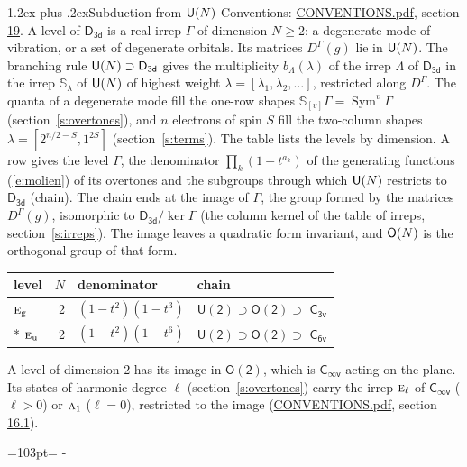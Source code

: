 \documentclass[10pt,a4paper]{article}
\makeatletter
\renewcommand\section{\@startsection{section}{1}{\z@}{-3ex plus -1ex minus -.2ex}%
  {1.2ex plus .2ex}{\normalfont\large\sffamily\bfseries\color{parttitle}}}
\newcommand{\needspace}[1]{\par\penalty-100\begingroup\dimen0=#1\relax\dimen2=\pagegoal
  \advance\dimen2-\pagetotal\ifdim\dimen0>\dimen2\relax\ifdim\dimen2>0pt\vfil\break\fi\fi
  \endgroup}
\numberwithin{equation}{section}
\newcommand{\grp}[1]{\mathsf{#1}}
\newcommand{\irr}[1]{\text{\normalfont\scshape #1}}
\newcommand{\ptag}[1]{\mathrm{#1}}
\newcommand{\repD}[1]{D^{#1}}
\newcommand{\schur}[1]{\mathbb{S}_{#1}}
\newcommand{\shape}[1]{[#1]}
\makeatother
\begin{document}
\section{Subduction from \texorpdfstring{$\grp{U(\mathnormal{N})}$}{U(N)}}\label{s:unitary}
Conventions: \href{../../CONVENTIONS.pdf}{CONVENTIONS.pdf}, section \href{../../CONVENTIONS.pdf\#conv.19}{19}.
\leavevmode\label{n:local.level.dimension}A level of $\grp{D_{3d}}$ is a real irrep $\Gamma$ of dimension $N \ge 2$: a degenerate mode of vibration, or a set of degenerate orbitals. \label{n:group.unitary}Its matrices $\repD{\Gamma}(g)$ lie in $\grp{U(\mathnormal{N})}$. \label{n:irrep.schur}\label{n:shape.partition}\label{n:local.partition}\label{n:function.multiplicity.unitary}The branching rule $\grp{U(\mathnormal{N})} \supset \grp{D_{3d}}$ gives the multiplicity $b_\Lambda(\lambda)$ of the irrep $\Lambda$ of $\grp{D_{3d}}$ in the irrep $\schur{\lambda}$ of $\grp{U(\mathnormal{N})}$ of highest weight $\lambda = \shape{\lambda_1, \lambda_2, \dots}$, restricted along $\repD{\Gamma}$. \label{n:local.partition.power}\label{n:local.electrons}\label{n:local.spin}The quanta of a degenerate mode fill the one-row shapes $\schur{\shape{v}}\Gamma = \operatorname{Sym}^{v}\Gamma$ (section~\ref{s:overtones}), and $n$ electrons of spin $S$ fill the two-column shapes $\lambda = \shape{2^{n/2-S}, 1^{2S}}$ (section~\ref{s:terms}).
The table lists the levels by dimension. \label{n:head.level}\label{n:head.denominator}\label{n:index.overtone.denominator}\label{n:head.chain}A row gives the level $\Gamma$, the denominator $\prod_k (1 - t^{a_k})$ of the generating functions (\ref{e:molien}) of its overtones and the subgroups through which $\grp{U(\mathnormal{N})}$ restricts to $\grp{D_{3d}}$ (chain). The chain ends at the image of $\Gamma$, the group formed by the matrices $\repD{\Gamma}(g)$, isomorphic to $\grp{D_{3d}}/\ker\Gamma$ (the column kernel of the table of irreps, section~\ref{s:irreps}). The image leaves a quadratic form invariant, and $\grp{O(\mathnormal{N})}$ is the orthogonal group of that form.
{\small\begin{longtable}{@{}lrll@{}}\toprule
level & $N$ & denominator & chain\\\midrule\endhead
\bottomrule\endfoot\endlastfoot
$\irr{e}_{\ptag{g}}$ & 2 & $(1-t^{2})(1-t^{3})$ & $\grp{U(2)} \supset \grp{O(2)} \supset$ \href{C3v.pdf}{$\grp{C_{3v}}$}\\*
$\irr{e}_{\ptag{u}}$ & 2 & $(1-t^{2})(1-t^{6})$ & $\grp{U(2)} \supset \grp{O(2)} \supset$ \href{C6v.pdf}{$\grp{C_{6v}}$}\\
\bottomrule\end{longtable}}
A level of dimension 2 has its image in $\grp{O(2)}$, which is \href{Cinfv.pdf}{$\grp{C_{\infty v}}$} acting on the plane. \label{n:index.harmonic.degree}Its states of harmonic degree $\ell$ (section~\ref{s:overtones}) carry the irrep $\irr{e}_{\ell}$ of \href{Cinfv.pdf}{$\grp{C_{\infty v}}$} ($\ell > 0$) or $\irr{a}_{1}$ ($\ell = 0$), restricted to the image (\href{../../CONVENTIONS.pdf}{CONVENTIONS.pdf}, section \href{../../CONVENTIONS.pdf\#conv.16.1}{16.1}).
\needspace{103pt}
\end{document}
